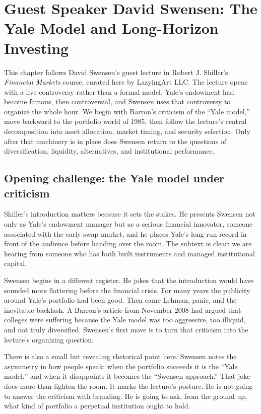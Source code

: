 \chapter{Guest Speaker David Swensen: The Yale Model and Long-Horizon Investing}

This chapter follows David Swensen's guest lecture in Robert J. Shiller's \emph{Financial Markets} course, curated here by LazyingArt LLC. The lecture opens with a live controversy rather than a formal model. Yale's endowment had become famous, then controversial, and Swensen uses that controversy to organize the whole hour. We begin with Barron's criticism of the ``Yale model,'' move backward to the portfolio world of 1985, then follow the lecture's central decomposition into asset allocation, market timing, and security selection. Only after that machinery is in place does Swensen return to the questions of diversification, liquidity, alternatives, and institutional performance.

\section{Opening challenge: the Yale model under criticism}

Shiller's introduction matters because it sets the stakes. He presents Swensen not only as Yale's endowment manager but as a serious financial innovator, someone associated with the early swap market, and he places Yale's long-run record in front of the audience before handing over the room. The subtext is clear: we are hearing from someone who has both built instruments and managed institutional capital.

Swensen begins in a different register. He jokes that the introduction would have sounded more flattering before the financial crisis. For many years the publicity around Yale's portfolio had been good. Then came Lehman, panic, and the inevitable backlash. A Barron's article from November 2008 had argued that colleges were suffering because the Yale model was too aggressive, too illiquid, and not truly diversified. Swensen's first move is to turn that criticism into the lecture's organizing question.

There is also a small but revealing rhetorical point here. Swensen notes the asymmetry in how people speak: when the portfolio succeeds it is the ``Yale model,'' and when it disappoints it becomes the ``Swensen approach.'' That joke does more than lighten the room. It marks the lecture's posture. He is not going to answer the criticism with branding. He is going to ask, from the ground up, what kind of portfolio a perpetual institution ought to hold.

